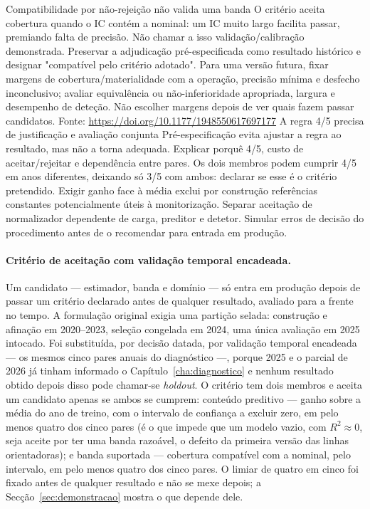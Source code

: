 {Compatibilidade por não-rejeição não valida uma banda}
{O critério aceita cobertura quando o IC contém a nominal: um IC muito
largo facilita passar, premiando falta de precisão. Não chamar a isso
validação/calibração demonstrada. Preservar a adjudicação pré-especificada
como resultado histórico e designar "compatível pelo critério adotado".
Para uma versão futura, fixar margens de cobertura/materialidade com
a operação, precisão mínima e desfecho inconclusivo; avaliar equivalência
ou não-inferioridade apropriada, largura e desempenho de deteção.
Não escolher margens depois de ver quais fazem passar candidatos.
Fonte: \url{https://doi.org/10.1177/1948550617697177}}%
{A regra 4/5 precisa de justificação e avaliação conjunta}
{Pré-especificação evita ajustar a regra ao resultado, mas não a torna
adequada. Explicar porquê 4/5, custo de aceitar/rejeitar e dependência entre
pares. Os dois membros podem cumprir 4/5 em anos diferentes, deixando
só 3/5 com ambos: declarar se esse é o critério pretendido.
Exigir ganho face à média exclui por construção referências constantes
potencialmente úteis à monitorização. Separar aceitação de normalizador
dependente de carga, preditor e detetor. Simular erros de decisão do
procedimento antes de o recomendar para entrada em produção.}%
\paragraph{Critério de aceitação com validação temporal encadeada.} Um
candidato --- estimador, banda e domínio --- só entra em produção depois de
passar um critério declarado antes de qualquer resultado, avaliado para a
frente no tempo. A formulação original exigia uma partição selada: construção
e afinação em 2020--2023, seleção congelada em 2024, uma única avaliação em
2025 intocado. Foi substituída, por decisão datada, por validação temporal
encadeada --- os mesmos cinco pares anuais do diagnóstico ---, porque 2025 e
o parcial de 2026 já tinham informado o Capítulo~\ref{cha:diagnostico} e
nenhum resultado obtido depois disso pode chamar-se \emph{holdout}. O critério
tem dois membros e aceita um candidato apenas se ambos se cumprem: conteúdo
preditivo --- ganho sobre a média do ano de treino, com o intervalo de
confiança a excluir zero, em pelo menos quatro dos cinco pares (é o que
impede que um modelo vazio, com $R^2 \approx 0$, seja aceite por ter uma
banda razoável, o defeito da primeira versão das linhas orientadoras); e
banda suportada --- cobertura compatível com a nominal, pelo intervalo, em
pelo menos quatro dos cinco pares. O limiar de quatro em cinco foi fixado
antes de qualquer resultado e não se mexe depois; a
Secção~\ref{sec:demonstracao} mostra o que depende dele.

